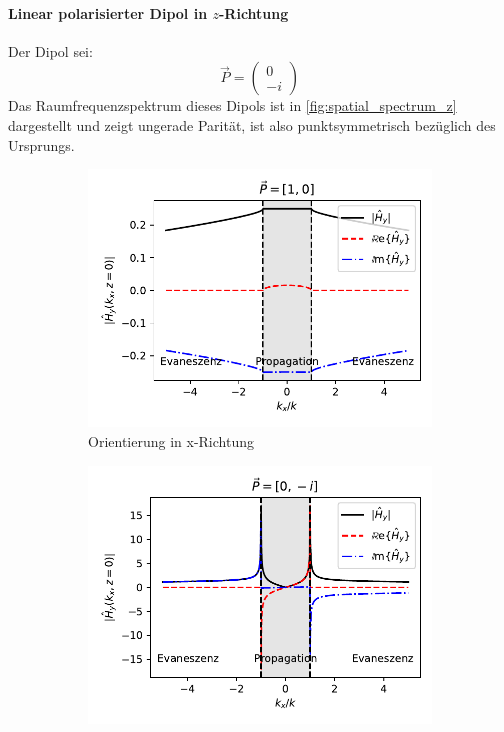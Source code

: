 \documentclass[a4paper, titlepage,  ngerman, fullpage]{book}
\begin{document}
	\paragraph{Linear polarisierter Dipol in $z$-Richtung}
	Der Dipol sei:
	$$\vec{P} = \begin{pmatrix} 0 \\ -i\end{pmatrix}$$
	Das Raumfrequenzspektrum dieses Dipols ist in \ref{fig:spatial_spectrum_z} dargestellt und zeigt ungerade Parität, ist also punktsymmetrisch bezüglich des Ursprungs.
	\begin{figure}
		\centering
		\label{fig:spatial_spectrum_zx}
		\begin{subfigure}{0.49\textwidth}
			\centering
			\includegraphics[width=\textwidth]{figures/spatial_spectrum_x.pdf}
			\caption{Orientierung in x-Richtung}
			\label{fig:spatial_spectrum_x}
		\end{subfigure}		
		\begin{subfigure}{0.5\textwidth}
			\centering
			\includegraphics[width=\textwidth]{figures/spatial_spectrum_z.pdf}

\end{subfigure}
\end{figure}
\end{document}

